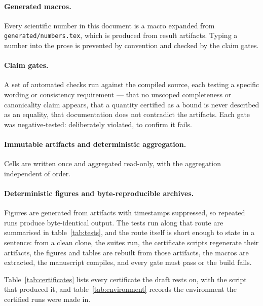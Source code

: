 \documentclass[11pt,a4paper]{article}
\theoremstyle{definition}
\theoremstyle{remark}
\begin{document}
\paragraph{Generated macros.} Every scientific number in this document is a macro
expanded from \texttt{generated/numbers.tex}, which is produced from result
artifacts. Typing a number into the prose is prevented by convention and checked
by the claim gates.

\paragraph{Claim gates.} A set of automated checks run against the compiled
source, each testing a specific wording or consistency requirement --- that no
unscoped completeness or canonicality claim appears, that a quantity certified as
a bound is never described as an equality, that documentation does not contradict
the artifacts. Each gate was negative-tested: deliberately violated, to confirm it
fails.

\paragraph{Immutable artifacts and deterministic aggregation.} Cells are written
once and aggregated read-only, with the aggregation independent of order.

\paragraph{Deterministic figures and byte-reproducible archives.} Figures are
generated from artifacts with timestamps suppressed, so repeated runs produce
byte-identical output. The tests run along that route are summarised in table~\ref{tab:tests}, and the
route itself is short enough to state in a sentence: from a clean clone, the
suites run, the certificate scripts regenerate their artifacts, the figures and
tables are rebuilt from those artifacts, the macros are extracted, the manuscript
compiles, and every gate must pass or the build fails.

Table~\ref{tab:certificates} lists every certificate the draft rests on, with
the script that produced it, and table~\ref{tab:environment} records the
environment the certified runs were made in.




\end{document}
